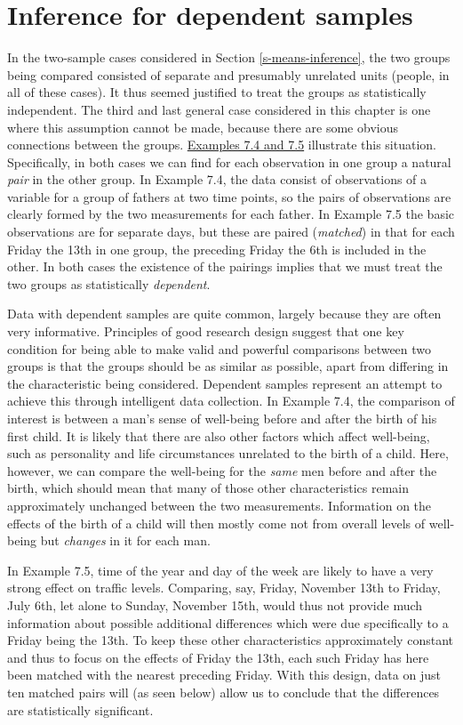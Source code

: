 \documentclass[11pt,a4paper,openany]{book}
\begin{document}
\section{Inference for dependent samples}\label{s-means-dependent}

In the two-sample cases considered in Section \ref{s-means-inference},
the two groups being compared consisted of separate and presumably
unrelated units (people, in all of these cases). It thus seemed
justified to treat the groups as statistically independent. The third
and last general case considered in this chapter is one where this
assumption cannot be made, because there are some obvious connections
between the groups. \protect\hyperlink{p-dependentex}{Examples 7.4 and
7.5} illustrate this situation. Specifically, in both cases we can find
for each observation in one group a natural \emph{pair} in the other
group. In Example 7.4, the data consist of observations of a variable
for a group of fathers at two time points, so the pairs of observations
are clearly formed by the two measurements for each father. In Example
7.5 the basic observations are for separate days, but these are paired
(\emph{matched}) in that for each Friday the 13th in one group, the
preceding Friday the 6th is included in the other. In both cases the
existence of the pairings implies that we must treat the two groups as
statistically \emph{dependent}.

Data with dependent samples are quite common, largely because they are
often very informative. Principles of good research design suggest that
one key condition for being able to make valid and powerful comparisons
between two groups is that the groups should be as similar as possible,
apart from differing in the characteristic being considered. Dependent
samples represent an attempt to achieve this through intelligent data
collection. In Example 7.4, the comparison of interest is between a
man's sense of well-being before and after the birth of his first child.
It is likely that there are also other factors which affect well-being,
such as personality and life circumstances unrelated to the birth of a
child. Here, however, we can compare the well-being for the \emph{same}
men before and after the birth, which should mean that many of those
other characteristics remain approximately unchanged between the two
measurements. Information on the effects of the birth of a child will
then mostly come not from overall levels of well-being but
\emph{changes} in it for each man.

In Example 7.5, time of the year and day of the week are likely to have
a very strong effect on traffic levels. Comparing, say, Friday, November
13th to Friday, July 6th, let alone to Sunday, November 15th, would thus
not provide much information about possible additional differences which
were due specifically to a Friday being the 13th. To keep these other
characteristics approximately constant and thus to focus on the effects
of Friday the 13th, each such Friday has here been matched with the
nearest preceding Friday. With this design, data on just ten matched
pairs will (as seen below) allow us to conclude that the differences are
statistically significant.
\end{document}

